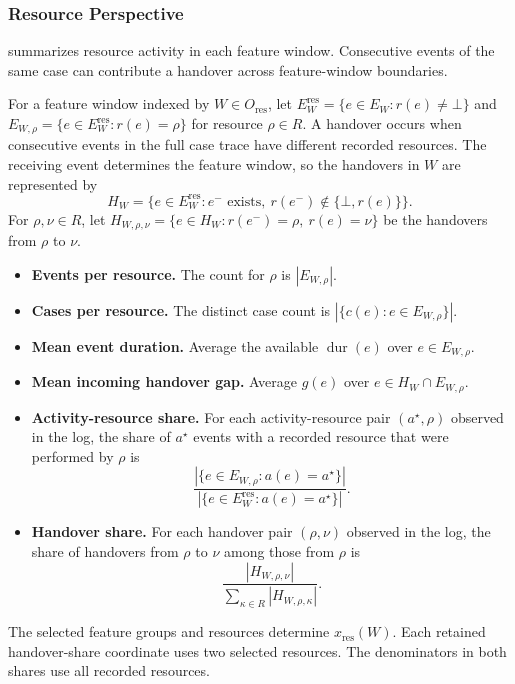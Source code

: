 \subsubsection{Resource Perspective}

 summarizes resource activity in each feature window. Consecutive events of the same case can contribute a handover across feature-window boundaries.

\begin{Definition}\label{def:resource-features}
For a feature window indexed by $W\in O_{\mathrm{res}}$, let $E_W^{\mathrm{res}}=\{e\in E_W:r(e)\ne\bot\}$ and $E_{W,\rho}=\{e\in E_W^{\mathrm{res}}:r(e)=\rho\}$ for resource $\rho\in R$. A handover occurs when consecutive events in the full case trace have different recorded resources. The receiving event determines the feature window, so the handovers in $W$ are represented by
\[
 H_W=\{e\in E_W^{\mathrm{res}}: e^-\text{ exists},\
                                  r(e^-)\notin\{\bot,r(e)\}\}.
\]
For $\rho,\nu\in R$, let $H_{W,\rho,\nu}=\{e\in H_W:r(e^-)=\rho,\ r(e)=\nu\}$ be the handovers from $\rho$ to $\nu$.
\begin{itemize}
  \item \textbf{Events per resource.} The count for $\rho$ is $|E_{W,\rho}|$.
  \item \textbf{Cases per resource.} The distinct case count is $|\{c(e):e\in E_{W,\rho}\}|$.
  \item \textbf{Mean event duration.} Average the available $\operatorname{dur}(e)$ over $e\in E_{W,\rho}$.
  \item \textbf{Mean incoming handover gap.} Average $g(e)$ over $e\in H_W\cap E_{W,\rho}$.
  \item \textbf{Activity-resource share.} For each activity-resource pair $(a^\star,\rho)$ observed in the log, the share of $a^\star$ events with a recorded resource that were performed by $\rho$ is
  \[
     \frac{|\{e\in E_{W,\rho}:a(e)=a^\star\}|}
          {|\{e\in E_W^{\mathrm{res}}:a(e)=a^\star\}|}.
  \]
  \item \textbf{Handover share.} For each handover pair $(\rho,\nu)$ observed in the log, the share of handovers from $\rho$ to $\nu$ among those from $\rho$ is
  \[
     \frac{|H_{W,\rho,\nu}|}{\sum_{\kappa\in R}|H_{W,\rho,\kappa}|}.
  \]
\end{itemize}
The selected feature groups and resources determine $x_{\mathrm{res}}(W)$. Each retained handover-share coordinate uses two selected resources. The denominators in both shares use all recorded resources.
\end{Definition}

